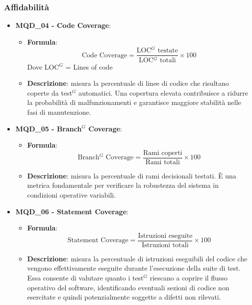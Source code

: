 \subsubsection{Affidabilità}
\begin{itemize}
\item \textbf{MQD\_04 - Code Coverage}:
    \begin{itemize}
        \item \textbf{Formula}:
        \[
            \text{Code Coverage} =
            \frac{\text{LOC$^G$ testate}}{\text{LOC$^G$ totali}} \times 100
        \]
		Dove LOC$^G$ = Lines of code
        \item \textbf{Descrizione}: misura la percentuale di linee di codice che risultano coperte da test$^G$ automatici. Una copertura elevata contribuisce a ridurre la probabilità di malfunzionamenti e garantisce maggiore stabilità nelle fasi di manutenzione.
    \end{itemize}

\item \textbf{MQD\_05 - Branch$^G$ Coverage}:
    \begin{itemize}
        \item \textbf{Formula}:
        \[
            \text{Branch$^G$ Coverage} =
            \frac{\text{Rami coperti}}{\text{Rami totali}} \times 100
        \]
        \item \textbf{Descrizione}: misura la percentuale di rami decisionali testati. È una metrica fondamentale per verificare la robustezza del sistema in condizioni operative variabili.
    \end{itemize}

\item \textbf{MQD\_06 - Statement Coverage}:
    \begin{itemize}
        \item \textbf{Formula}:
        \[
            \text{Statement Coverage} =
            \frac{\text{Istruzioni eseguite}}{\text{Istruzioni totali}} \times 100
        \]
        \item \textbf{Descrizione}: misura la percentuale di istruzioni eseguibili del codice che vengono effettivamente eseguite durante l’esecuzione della suite di test. Essa consente di valutare quanto i test$^G$ riescano a coprire il flusso operativo del software, identificando eventuali sezioni di codice non esercitate e quindi potenzialmente soggette a difetti non rilevati.
    \end{itemize}
\end{itemize}

